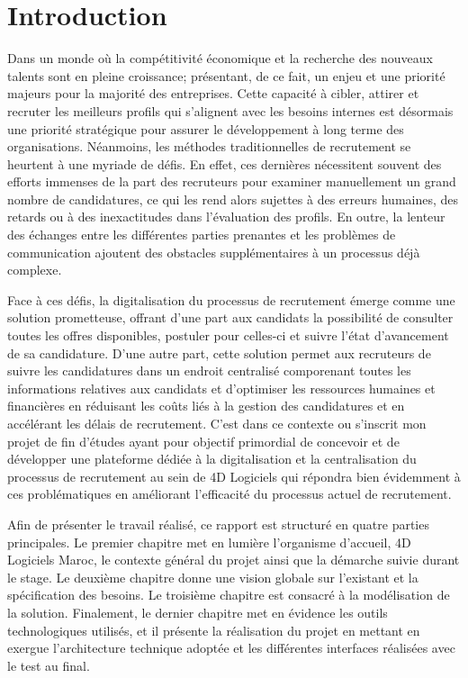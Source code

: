 \chapter*{Introduction}

Dans un monde où la compétitivité économique et la recherche des nouveaux talents
sont en pleine croissance; présentant, de ce fait, un enjeu et une priorité majeurs pour la
majorité des entreprises. Cette capacité à cibler, attirer et recruter les meilleurs profils qui
s’alignent avec les besoins internes est désormais une priorité stratégique pour assurer le
développement à long terme des organisations. Néanmoins, les méthodes traditionnelles de
recrutement se heurtent à une myriade de défis. En effet, ces dernières nécessitent souvent
des efforts immenses de la part des recruteurs pour examiner manuellement un grand
nombre de candidatures, ce qui les rend alors sujettes à des erreurs humaines, des retards
ou à des inexactitudes dans l’évaluation des profils. En outre, la lenteur des échanges entre
les différentes parties prenantes et les problèmes de communication ajoutent des obstacles
supplémentaires à un processus déjà complexe.
\newline

Face à ces défis, la digitalisation du processus de recrutement émerge comme une
solution prometteuse, offrant d’une part aux candidats la possibilité de consulter toutes les
offres disponibles, postuler pour celles-ci et suivre l’état d’avancement de sa candidature.
D’une autre part, cette solution permet aux recruteurs de suivre les candidatures dans un endroit centralisé
comporenant toutes les informations relatives aux candidats et d’optimiser les ressources humaines et financières en réduisant les coûts
liés à la gestion des candidatures et en accélérant les délais de recrutement. C’est dans
ce contexte ou s’inscrit mon projet de fin d’études ayant pour objectif primordial de
concevoir et de développer une plateforme dédiée à la digitalisation et la centralisation
du processus de recrutement au sein de 4D Logiciels qui répondra bien évidemment à ces
problématiques en améliorant l’efficacité du processus actuel de recrutement.  
\newline

Afin de présenter le travail réalisé, ce rapport est structuré en quatre parties principales. 
Le premier chapitre met en lumière l’organisme d’accueil, 4D Logiciels Maroc,
le contexte général du projet ainsi que la démarche suivie durant le stage. 
Le deuxième chapitre donne une vision globale sur l’existant et la spécification
des besoins. Le troisième chapitre est consacré à la modélisation de la
solution. Finalement, le dernier
chapitre met en évidence les outils technologiques utilisés, et il présente la réalisation du projet en mettant en exergue l’architecture technique
adoptée et les différentes interfaces réalisées avec le test au final.



